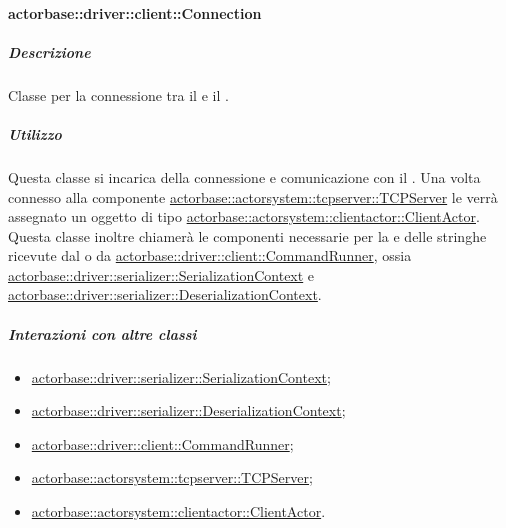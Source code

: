 \documentclass{scalatekids-article}
\begin{document}
\paragraph{actorbase::driver::client::Connection}
\label{sec:actorbase::driver::client::Connection}

\subparagraph{Descrizione}

Classe per la connessione tra il  e il .

\subparagraph{Utilizzo}

Questa classe si incarica della connessione e comunicazione con il . Una volta
connesso alla componente \hyperref[sec:actorbase::actorsystem::tcpserver::TCPServer]{actorbase::actorsystem::\allowbreak{}tcpserver::\allowbreak{}TCPServer}
le verrà assegnato un oggetto di tipo \hyperref[sec:actorbase::actorsystem::clientactor::ClientActor]{actorbase::\allowbreak{}actorsystem::\allowbreak{}clientactor::\allowbreak{}ClientActor}.\\
Questa classe inoltre chiamerà le componenti necessarie per la  e 
delle stringhe ricevute dal  o da \hyperref[sec:actorbase::driver::client::CommandRunner]{actorbase::\allowbreak{}driver::\allowbreak{}client::\allowbreak{}CommandRunner},
ossia \hyperref[sec:actorbase::driver::serializer::SerializationContext]{actorbase::\allowbreak{}driver::\allowbreak{}serializer::\allowbreak{}SerializationContext}
e \hyperref[sec:actorbase::driver::serializer::Deserializationtext]{actorbase::\allowbreak{}driver::\allowbreak{}serializer::\allowbreak{}DeserializationContext}.

\subparagraph{Interazioni con altre classi}
\begin{itemize}
\item \hyperref[sec:actorbase::driver::serializer::SerializationContext]{actorbase::driver::serializer::SerializationContext};
\item \hyperref[sec:actorbase::driver::serializer::Deserializationtext]{actorbase::driver::serializer::DeserializationContext};
\item \hyperref[sec:actorbase::driver::client::CommandRunner]{actorbase::driver::client::CommandRunner};
\item \hyperref[sec:actorbase::actorsystem::tcpserver::TCPServer]{actorbase::actorsystem::tcpserver::TCPServer};
\item \hyperref[sec:actorbase::actorbase::actorsystem::clientactor::ClientActor]{actorbase::actorsystem::clientactor::ClientActor}.
\end{itemize}
\end{document}
